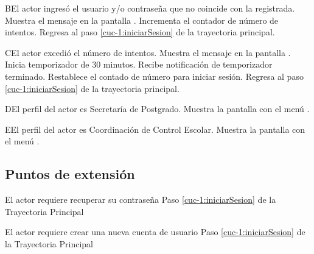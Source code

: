 \begin{UCtrayectoriaA}{B}{El actor ingresó el usuario y/o contraseña que no coincide con la registrada.}
	\UCpaso[\UCsist] Muestra el mensaje  en la pantalla .
	\UCpaso[\UCsist] Incrementa el contador de número de intentos.
	\UCpaso[] Regresa al paso \ref{cuc-1:iniciarSesion} de la trayectoria principal.
\end{UCtrayectoriaA}

\begin{UCtrayectoriaA}{C}{El actor excedió el número de intentos.}
	\UCpaso[\UCsist] Muestra el mensaje  en la pantalla .
	\UCpaso[\UCsist] Inicia temporizador de 30 minutos.
	\UCpaso[\UCsist] Recibe notificación de temporizador terminado.
	\UCpaso[\UCsist] Restablece el contado de número para iniciar sesión.
	\UCpaso[] Regresa al paso \ref{cuc-1:iniciarSesion} de la trayectoria principal.
\end{UCtrayectoriaA}

\begin{UCtrayectoriaA}{D}{El perfil del actor es Secretaría de Postgrado.}
	\UCpaso [\UCsist] Muestra la pantalla  con el menú .
\end{UCtrayectoriaA}

\begin{UCtrayectoriaA}{E}{El perfil del actor es Coordinación de Control Escolar.}
	\UCpaso [\UCsist] Muestra la pantalla  con el menú .
\end{UCtrayectoriaA}

\subsection{Puntos de extensión}
\UCExtensionPoint
{El actor requiere recuperar su contraseña}
{ Paso \ref{cuc-1:iniciarSesion} de la Trayectoria Principal}
{}

\UCExtensionPoint
{El actor requiere crear una nueva cuenta de usuario}
{ Paso \ref{cuc-1:iniciarSesion} de la Trayectoria Principal}
{}
